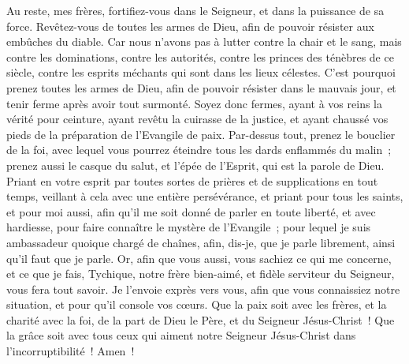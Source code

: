 \begin{multicols}{2}
Au reste, mes frères, fortifiez-vous dans le Seigneur, et dans la puissance de sa force.
Revêtez-vous de toutes les armes de Dieu, afin de pouvoir résister aux embûches du diable.
Car nous n'avons pas à lutter contre la chair et le sang, mais contre les dominations, contre les autorités, contre les princes des ténèbres de ce siècle, contre les esprits méchants qui sont dans les lieux célestes.
C'est pourquoi prenez toutes les armes de Dieu, afin de pouvoir résister dans le mauvais jour, et tenir ferme après avoir tout surmonté.
Soyez donc fermes, ayant à vos reins la vérité pour ceinture, ayant revêtu la cuirasse de la justice,
et ayant chaussé vos pieds de la préparation de l'Evangile de paix.
Par-dessus tout, prenez le bouclier de la foi, avec lequel vous pourrez éteindre tous les dards enflammés du malin~;
prenez aussi le casque du salut, et l'épée de l'Esprit, qui est la parole de Dieu.
Priant en votre esprit par toutes sortes de prières et de supplications en tout temps, veillant à cela avec une entière persévérance, et priant pour tous les saints,
et pour moi aussi, afin qu'il me soit donné de parler en toute liberté, et avec hardiesse, pour faire connaître le mystère de l'Evangile~;
pour lequel je suis ambassadeur quoique chargé de chaînes, afin, dis-je, que je parle librement, ainsi qu'il faut que je parle.
Or, afin que vous aussi, vous sachiez ce qui me concerne, et ce que je fais, Tychique, notre frère bien-aimé, et fidèle serviteur du Seigneur, vous fera tout savoir.
Je l'envoie exprès vers vous, afin que vous connaissiez notre situation, et pour qu'il console vos cœurs.
Que la paix soit avec les frères, et la charité avec la foi, de la part de Dieu le Père, et du Seigneur Jésus-Christ~!
Que la grâce soit avec tous ceux qui aiment notre Seigneur Jésus-Christ dans l'incorruptibilité~! Amen~!
\PPE{}
\end{multicols}
